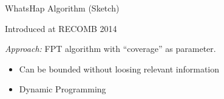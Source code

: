 \documentclass[notes=hide]{beamer}
\begin{document}
%		
%


\begin{frame}{WhatsHap Algorithm (Sketch)}
		\begin{block}{}
			Introduced at RECOMB 2014
		\end{block}
\begin{block}{}
\emph{Approach:} FPT algorithm with ``coverage'' as parameter.
\begin{itemize}
 \item Can be bounded without loosing relevant information
 \item Dynamic Programming
\end{itemize}
\end{block}
\end{frame}
\end{document}
